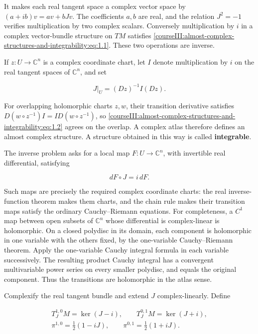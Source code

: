 It makes each real tangent space a complex vector space by
\((a+ib)v=av+bJv\). The coefficients \(a,b\) are real, and the relation \(J^2=-1\) verifies multiplication by two complex scalars. Conversely multiplication by \(i\) in a complex vector-bundle structure on \(TM\) satisfies \eqref{courseIII:almost-complex-structures-and-integrability:eq:1.1}. These two operations are inverse.

If \(z:U\to\mathbb C^n\) is a complex coordinate chart, let \(I\) denote multiplication by \(i\) on the real tangent spaces of \(\mathbb C^n\), and set

\begin{equation}
J|_U=(Dz)^{-1}I(Dz).
\label{courseIII:almost-complex-structures-and-integrability:eq:1.2}
\end{equation}

For overlapping holomorphic charts \(z,w\), their transition derivative satisfies \(D(w\circ z^{-1})I=I D(w\circ z^{-1})\), so \eqref{courseIII:almost-complex-structures-and-integrability:eq:1.2} agrees on the overlap. A complex atlas therefore defines an almost complex structure. A structure obtained in this way is called \textbf{integrable}.

The inverse problem asks for a local map \(F:U\to\mathbb C^n\), with invertible real differential, satisfying

\begin{equation}
dF\circ J=i\,dF.
\label{courseIII:almost-complex-structures-and-integrability:eq:1.3}
\end{equation}

Such maps are precisely the required complex coordinate charts: the real inverse-function theorem makes them charts, and the chain rule makes their transition maps satisfy the ordinary Cauchy--Riemann equations. For completeness, a \(C^1\) map between open subsets of \(\mathbb C^n\) whose differential is complex-linear is holomorphic. On a closed polydisc in its domain, each component is holomorphic in one variable with the others fixed, by the one-variable Cauchy--Riemann theorem. Apply the one-variable Cauchy integral formula in each variable successively. The resulting product Cauchy integral has a convergent multivariable power series on every smaller polydisc, and equals the original component. Thus the transitions are holomorphic in the atlas sense.

Complexify the real tangent bundle and extend \(J\) complex-linearly. Define

\begin{equation}
\begin{gathered}
T^{1,0}_JM=\ker(J-i),\qquad T^{0,1}_JM=\ker(J+i),\\
\pi^{1,0}=\tfrac12(1-iJ),\qquad
\pi^{0,1}=\tfrac12(1+iJ).
\end{gathered}
\label{courseIII:almost-complex-structures-and-integrability:eq:1.4}
\end{equation}

